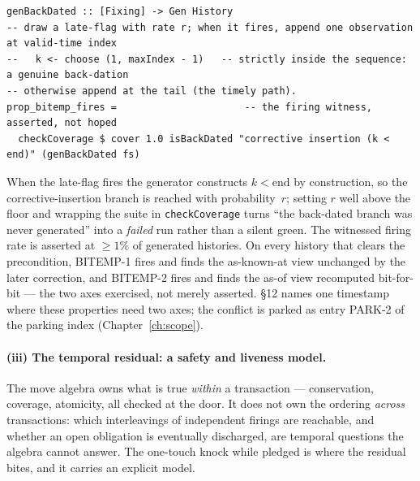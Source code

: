 \begin{lstlisting}
genBackDated :: [Fixing] -> Gen History
-- draw a late-flag with rate r; when it fires, append one observation at valid-time index
--   k <- choose (1, maxIndex - 1)   -- strictly inside the sequence: a genuine back-dation
-- otherwise append at the tail (the timely path).
prop_bitemp_fires =                      -- the firing witness, asserted, not hoped
  checkCoverage $ cover 1.0 isBackDated "corrective insertion (k < end)" (genBackDated fs)
\end{lstlisting}

When the late-flag fires the generator constructs $k<\text{end}$ by construction, so the
corrective-insertion branch is reached with probability~$r$; setting $r$ well above the floor
and wrapping the suite in \texttt{checkCoverage} turns ``the back-dated branch was never
generated'' into a \emph{failed} run rather than a silent green. The witnessed firing rate is
asserted at $\ge 1\%$ of generated histories. On every history that clears the precondition,
BITEMP-1 fires and finds the as-known-at view unchanged by the later correction, and BITEMP-2
fires and finds the as-of view recomputed bit-for-bit --- the two axes exercised, not merely
asserted. \S 12 names one timestamp where these properties need two axes; the conflict is
parked as entry PARK-2 of the parking index (Chapter~\ref{ch:scope}).

\paragraph{(iii) The temporal residual: a safety and liveness model.}
The move algebra owns what is true \emph{within} a transaction --- conservation, coverage,
atomicity, all checked at the door. It does not own the ordering \emph{across} transactions:
which interleavings of independent firings are reachable, and whether an open obligation is
eventually discharged, are temporal questions the algebra cannot answer. The one-touch knock
while pledged is where the residual bites, and it carries an explicit model.

